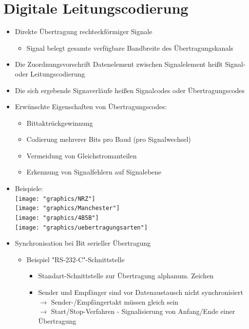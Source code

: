 \documentclass{scrreprt}
\begin{document}
\section{Digitale Leitungscodierung}
\label{sec:Leitungscodierung}
\begin{itemize}
	\item Direkte Übertragung rechteckförmiger Signale
	      \begin{itemize}
		      \item Signal belegt gesamte verfügbare Bandbreite des Übertragungskanals
	      \end{itemize}
	\item Die Zuordnungsvorschrift Datenelement zwischen Signalelement heißt Signal- oder Leitungscodierung
	\item Die sich ergebende Signaverläufe heißen Signalcodes oder Übertragungscodes
	\item Erwünschte Eigenschaften von Übertragungscodes:
	      \begin{itemize}
		      \item Bittaktrückgewinnung
		      \item Codierung mehrerer Bits pro Baud (pro Signalwechsel)
		      \item Vermeidung von Gleichstromanteilen
		      \item Erkennung von Signalfehlern auf Signalebene
	      \end{itemize}
	\item Beispiele: 
		  \\
	      \texttt{[image: "graphics/NRZ"]}
	      \\
	      \texttt{[image: "graphics/Manchester"]}
	      \\
	      \texttt{[image: "graphics/4B5B"]}
	      \\
	      \texttt{[image: "graphics/uebertragungsarten"]}
	\item Synchronisation bei Bit serieller Übertragung
	      \begin{itemize}
		      \item Beispiel "RS-232-C"-Schnittstelle
		    \begin{itemize}
				\item Standart-Schnittstelle zur Übertragung alphanum. Zeichen
				\item Sender und Empfänger sind vor Datenaustausch nicht synchronisiert
				\\$\rightarrow$ Sender-/Empfängertakt müssen gleich sein
				\\$\rightarrow$ Start/Stop-Verfahren - Signalisierung von Anfang/Ende einer Übertragung

\end{itemize}
\end{itemize}
\end{itemize}
\end{document}
